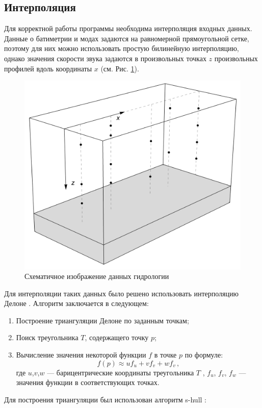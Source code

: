 \documentclass{fefu}
\newcommand{\pa}[1]{\left(#1\right)}
\begin{document}
        \subsection{Интерполяция}
            \par Для корректной работы программы необходима интерполяция входных данных. Данные о батиметрии и модах задаются на равномерной прямоугольной сетке, поэтому для них можно использовать простую билинейную интерполяцию, однако значения скорости звука задаются в произвольных точках $z$ произвольных профилей вдоль координаты $x$ (см. Рис. \ref{fig::hydrology}).
            \begin{figure}[h]
                \centering
                \includegraphics[width=0.5\linewidth]{hydrology}
                \caption{\label{fig::hydrology}Схематичное изображение данных гидрологии}
            \end{figure}
            Для интерполяции таких данных было решено использовать интерполяцию Делоне \cite{interpolation}. Алгоритм заключается в следующем:
            \begin{enumerate}
                \item Построение триангуляции Делоне \cite{delaunay} по заданным точкам;
                \item Поиск треугольника $T$, содержащего точку $p$;
                \item Вычисление значения некоторой функции $f$ в точке $p$ по формуле:
                    \begin{equation}
                        f\pa{p}\approx uf_u+vf_v+wf_v\,,
                    \end{equation}
                    где $u$,$v$,$w$ --- барицентрические координаты треугольника $T$ \cite{bary}, $f_u$, $f_v$, $f_w$ --- значения функции в соответствующих точках.
            \end{enumerate}
            Для построения триангуляции был использован алгоритм s-hull \cite{shull}:
\end{document}
